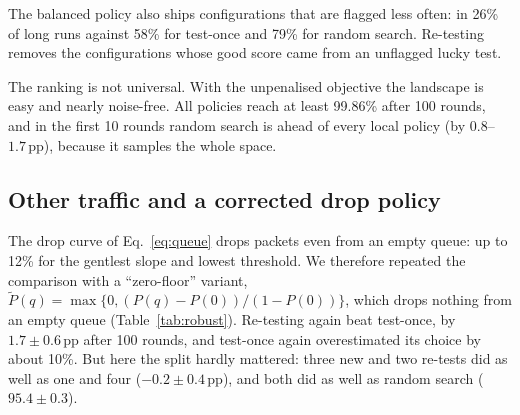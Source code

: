 \documentclass[11pt,a4paper]{article}
\newcommand{\pp}{\,\text{pp}}
\begin{document}
The balanced policy also ships configurations that are flagged less often: in 26\% of long runs against 58\% for test-once and 79\% for random search. Re-testing removes the configurations whose good score came from an unflagged lucky test.

The ranking is not universal. With the unpenalised objective the landscape is easy and nearly noise-free. All policies reach at least 99.86\% after 100 rounds, and in the first 10 rounds random search is ahead of every local policy (by $0.8$--$1.7\pp$), because it samples the whole space.

\subsection{Other traffic and a corrected drop policy}
\label{sec:robust}

\begin{table}[t]
\caption{Re-testing against test-once in the other regimes, penalised objective, 100 paired replications. ``1/4'': one new configuration and four re-tests per round; ``3/2'': three and two. Differences are 1/4 minus test-once.}
\label{tab:robust}
\centering\small
{}
\end{table}

The drop curve of Eq.~\eqref{eq:queue} drops packets even from an empty queue: up to 12\% for the gentlest slope and lowest threshold. We therefore repeated the comparison with a ``zero-floor'' variant, $\tilde P(q)=\max\{0,(P(q)-P(0))/(1-P(0))\}$, which drops nothing from an empty queue (Table~\ref{tab:robust}). Re-testing again beat test-once, by $1.7\pm0.6\pp$ after 100 rounds, and test-once again overestimated its choice by about 10\%. But here the split hardly mattered: three new and two re-tests did as well as one and four ($-0.2\pm0.4\pp$), and both did as well as random search ($95.4\pm0.3$).
\end{document}
